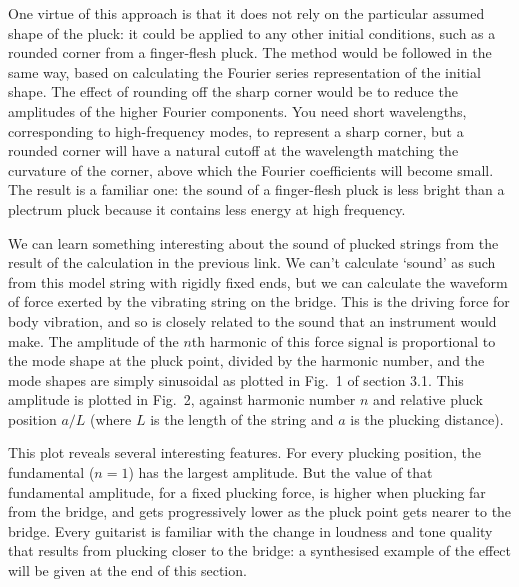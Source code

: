   One virtue of this approach is that it does not rely on the particular 
  assumed shape of the pluck: it could be applied to any other initial 
  conditions, such as a rounded corner from a finger-flesh pluck. The method 
  would be followed in the same way, based on calculating the Fourier series 
  representation of the initial shape. The effect of rounding off the sharp 
  corner would be to reduce the amplitudes of the higher Fourier components. 
  You need short wavelengths, corresponding to high-frequency modes, to 
  represent a sharp corner, but a rounded corner will have a natural cutoff at 
  the wavelength matching the curvature of the corner, above which the Fourier 
  coefficients will become small. The result is a familiar one: the sound of a 
  finger-flesh pluck is less bright than a plectrum pluck because it contains 
  less energy at high frequency. 

  We can learn something interesting about the sound of plucked strings from 
  the result of the calculation in the previous link. We can't calculate 
  `sound' as such from this model string with rigidly fixed ends, but we can 
  calculate the waveform of force exerted by the vibrating string on the 
  bridge. This is the driving force for body vibration, and so is closely 
  related to the sound that an instrument would make. The amplitude of the 
  $n$th harmonic of this force signal is proportional to the mode shape at the 
  pluck point, divided by the harmonic number, and the mode shapes are simply 
  sinusoidal as plotted in Fig.\ 1 of section 3.1. This amplitude is plotted in 
  Fig.\ 2, against harmonic number $n$ and relative pluck position $a/L$ (where 
  $L$ is the length of the string and $a$ is the plucking distance). 


  This plot reveals several interesting features. For every plucking position, 
  the fundamental ($n=1$) has the largest amplitude. But the value of that 
  fundamental amplitude, for a fixed plucking force, is higher when plucking 
  far from the bridge, and gets progressively lower as the pluck point gets 
  nearer to the bridge. Every guitarist is familiar with the change in loudness 
  and tone quality that results from plucking closer to the bridge: a 
  synthesised example of the effect will be given at the end of this section. 

